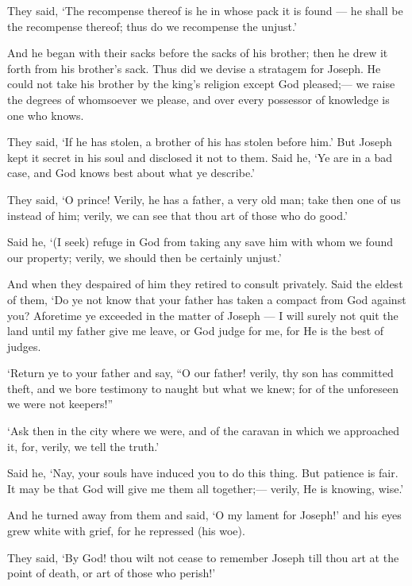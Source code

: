 \documentclass[fontsize=14pt, letterpaper, notitlepage, openany, DIV=12]{scrbook} %
\begin{document}
\noindent[12:75]
They said, `The recompense thereof is he in whose pack it is found --- he shall be the
recompense thereof; thus do we recompense the unjust.'

\noindent[12:76]
And he began with their sacks before the sacks of his brother; then he drew it forth from
his brother's sack. Thus did we devise a stratagem for Joseph. He could not take his brother by
the king's religion except God pleased;--- we raise the degrees of whomsoever we please, and
over every possessor of knowledge is one who knows.

\noindent[12:77]
They said, `If he has stolen, a brother of his has stolen before him.' But Joseph kept it
secret in his soul and disclosed it not to them. Said he, `Ye are in a bad case, and God knows best
about what ye describe.'

\noindent[12:78]
They said, `O prince! Verily, he has a father, a very old man; take then one of us instead
of him; verily, we can see that thou art of those who do good.'

\noindent[12:79]
Said he, `(I seek) refuge in God from taking any save him with whom we found our
property; verily, we should then be certainly unjust.'

\noindent[12:80]
And when they despaired of him they retired to consult privately. Said the eldest of them,
`Do ye not know that your father has taken a compact from God against you? Aforetime ye
exceeded in the matter of Joseph --- I will surely not quit the land until my father give me leave,
or God judge for me, for He is the best of judges.

\noindent[12:81]
`Return ye to your father and say, ``O our father! verily, thy son has committed theft, and
we bore testimony to naught but what we knew; for of the unforeseen we were not keepers!''

\noindent[12:82]
`Ask then in the city where we were, and of the caravan in which we approached it, for,
verily, we tell the truth.'

\noindent[12:83]
Said he, `Nay, your souls have induced you to do this thing. But patience is fair. It may
be that God will give me them all together;--- verily, He is knowing, wise.'

\noindent[12:84]
And he turned away from them and said, `O my lament for Joseph!' and his eyes grew
white with grief, for he repressed (his woe).

\noindent[12:85]
They said, `By God! thou wilt not cease to remember Joseph till thou art at the point of
death, or art of those who perish!'
\end{document}
